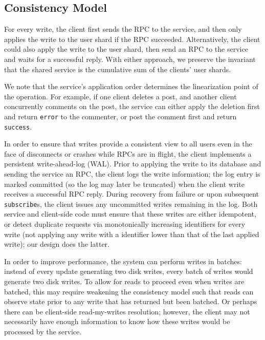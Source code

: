 \documentclass[letterpaper,twocolumn,10pt]{article}
\begin{document}
\subsection{Consistency Model}
\label{sec:logging}
For every write, the client first sends the RPC to the service, and then only applies the write to the user shard if the RPC succeeded. 
Alternatively, the client could also apply the write to the user shard, then 
send an RPC to the service and waits for a successful reply.
With either approach, we preserve the invariant that the shared service is the 
cumulative sum of the clients' user shards.

We note that the service's application order determines the linearization point of the operation.
For example, if one client deletes a post, and another client concurrently comments on the post,
the service can either apply the deletion first and return \texttt{error} to the commenter, or post the comment first
and return \texttt{success}.

In order to ensure that writes provide a consistent view to all users even in the face of disconnects or crashes 
while RPCs are in flight, the client implements a persistent write-ahead-log (WAL). 
Prior to applying the write to its database and sending the service an RPC, the client logs the write information; 
the log entry is marked committed (so the log may later be truncated) when the client write receives a successful RPC reply. 
During recovery from failure or upon subsequent \texttt{subscribe}s, the client issues any uncommitted writes remaining in the log. 
Both service and client-side code must ensure that these writes are either idempotent, or detect duplicate requests via 
monotonically increasing identifiers for every write (not applying any write with a identifier lower than that of the last applied write); our design
does the latter.

In order to improve performance, the system can perform writes in batches: instead of every update generating two disk writes, every batch of writes would generate two disk writes. 
To allow for reads to proceed even when writes are batched, this may require weakening the consistency model such that reads can observe state prior to any write that has returned but been batched. 
Or perhaps there can be client-side read-my-writes resolution; however, the client may not necessarily have enough information to know how these writes would be processed by the service.
\end{document}
